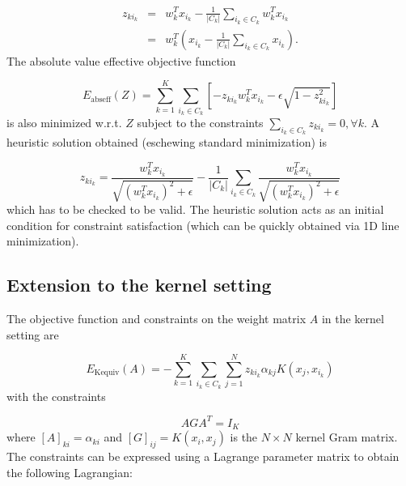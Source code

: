 \begin{equation}
\begin{array}{ccc}
z_{ki_{k}} & = & w_{k}^{T}x_{i_{k}}-\frac{1}{|C_{k}|}\sum_{i_{k}\in C_{k}}w_{k}^{T}x_{i_{k}}\\
 & = & w_{k}^{T}\left(x_{i_{k}}-\frac{1}{|C_{k}|}\sum_{i_{k}\in C_{k}}x_{i_{k}}\right).
\end{array}\label{eq:Zsolquad}
\end{equation}
The absolute value effective objective function 

\begin{equation}
E_{\mathrm{abseff}}(Z)=\sum_{k=1}^{K}\sum_{i_{k}\in C_{k}}\left[-z_{ki_{k}}w_{k}^{T}x_{i_{k}}-\epsilon\sqrt{1-z_{ki_{k}}^{2}}\right]\label{eq:Eabseff}
\end{equation}
is also minimized w.r.t. $Z$ subject to the constraints $\sum_{i_{k}\in C_{k}}z_{ki_{k}}=0,\forall k$.
A heuristic solution obtained (eschewing standard minimization) is 

\begin{equation}
z_{ki_{k}}=\frac{w_{k}^{T}x_{i_{k}}}{\sqrt{\left(w_{k}^{T}x_{i_{k}}\right)^{2}+\epsilon}}-\frac{1}{|C_{k}|}\sum_{i_{k}\in C_{k}}\frac{w_{k}^{T}x_{i_{k}}}{\sqrt{\left(w_{k}^{T}x_{i_{k}}\right)^{2}+\epsilon}}\label{eq:Zsolabs}
\end{equation}
{\small{}which has to be checked to be valid. The heuristic solution
acts as an initial condition for constraint satisfaction (which can
be quickly obtained via 1D line minimization).}{\small\par}

\subsection{Extension to the kernel setting}

The objective function and constraints on the weight matrix $A$ in
the kernel setting are 

\begin{equation}
E_{\mathrm{Kequiv}}(A)=-\sum_{k=1}^{K}\sum_{i_{k}\in C_{k}}\sum_{j=1}^{N}z_{ki_{k}}\alpha_{kj}K(x_{j},x_{i_{k}})\label{eq:EKequivA}
\end{equation}
with the constraints 

\begin{equation}
AGA^{T}=I_{K}\label{eq:AGAeqIK}
\end{equation}
where $\left[A\right]_{ki}=\alpha_{ki}$ and $\left[G\right]_{ij}=K(x_{i},x_{j})$
is the $N\times N$ kernel Gram matrix. The constraints can be expressed
using a Lagrange parameter matrix to obtain the following Lagrangian:

